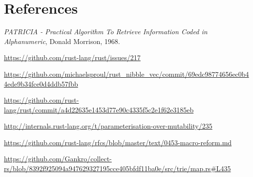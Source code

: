 \documentclass[a4paper,12pt]{article}
\begin{document}
\section{References}

\textit{PATRICIA - Practical Algorithm To Retrieve Information Coded in Alphanumeric}, Donald Morrison, 1968.

\url{https://github.com/rust-lang/rust/issues/217}

\url{https://github.com/michaelsproul/rust\_nibble\_vec/commit/69edc98774656ec0b44ede9b34fce0d4ddb57fbb}

\url{https://github.com/rust-lang/rust/commit/a4d22635e1453d77e90c4335f5c2e1f62e3185eb}

\url{http://internals.rust-lang.org/t/parameterisation-over-mutability/235}

\url{https://github.com/rust-lang/rfcs/blob/master/text/0453-macro-reform.md}

\url{https://github.com/Gankro/collect-rs/blob/8392f925094a947629327195cce405bfdf11ba0e/src/trie/map.rs\#L435}
\end{document}
